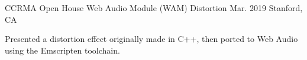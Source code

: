 \begin{cventries}
    \cventry
    {CCRMA Open House} %
    {Web Audio Module (WAM) Distortion} %
    {Mar. 2019} %
    {Stanford, CA} %
    {
      \begin{cvitems} %
        \item {Presented a distortion effect originally made in C++, then ported to Web Audio using the Emscripten toolchain.}
      \end{cvitems}
    }

\end{cventries}
